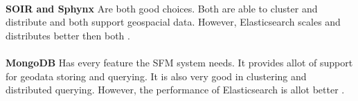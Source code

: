 {{	\\%
	\textbf{SOIR and Sphynx} Are both good choices. Both are able to cluster and distribute and both support geospacial data. However, Elasticsearch scales and distributes better then both \cite{elasticsearchcreator}.\\
	\\
	\textbf{MongoDB} Has every feature the SFM system needs. It provides allot of support for geodata storing and querying. It is also very good in clustering and distributed querying. However, the performance of Elasticsearch is allot better \cite{mongovselastic}.
	}\\
}